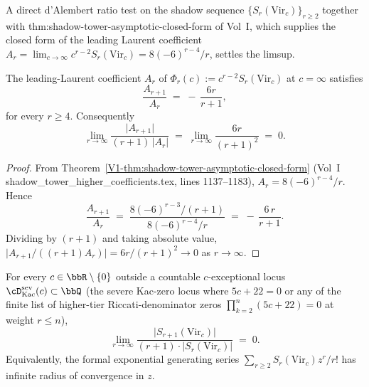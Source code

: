 A direct d'Alembert ratio test on the shadow sequence
$\{S_r(\mathrm{Vir}_c)\}_{r \ge 2}$ together with
\textsf{thm:shadow-tower-asymptotic-closed-form} of Vol~I, which supplies the
closed form of the leading Laurent coefficient
$A_r = \lim_{c \to \infty} c^{r-2} S_r(\mathrm{Vir}_c) =
8 (-6)^{r-4} / r$, settles the limsup.

\begin{lemma}
\label{lem:leading-coefficient-ratio-identity}
The leading-Laurent coefficient $A_r$ of
$\Phi_r(c) := c^{r-2} S_r(\mathrm{Vir}_c)$ at $c = \infty$ satisfies
\[
 \frac{A_{r+1}}{A_r}
 \;=\;
 -\,\frac{6 r}{r+1},
\]
for every $r \ge 4$. Consequently
\[
 \lim_{r \to \infty}
 \frac{\lvert A_{r+1} \rvert}{(r+1)\,\lvert A_r \rvert}
 \;=\;
 \lim_{r \to \infty}
 \frac{6 r}{(r+1)^2}
 \;=\;
 0.
\]
\end{lemma}

\begin{proof}
From Theorem~\ref{V1-thm:shadow-tower-asymptotic-closed-form}
(Vol~I shadow\_tower\_higher\_coefficients.tex, lines 1137--1183),
$A_r = 8 (-6)^{r-4} / r$. Hence
\[
 \frac{A_{r+1}}{A_r}
 \;=\;
 \frac{8 (-6)^{r-3} / (r+1)}{8 (-6)^{r-4} / r}
 \;=\;
 -\,\frac{6\,r}{r+1}.
\]
Dividing by $(r+1)$ and taking absolute value,
$\lvert A_{r+1} / ((r+1) A_r) \rvert = 6r / (r+1)^2 \to 0$ as
$r \to \infty$.
\end{proof}

\begin{proposition}
\label{prop:virasoro-ratio-test}
For every $c \in \bbR \setminus \{0\}$ outside a countable
$c$-exceptional locus $\cD^{\mathrm{sev}}_{\mathrm{Kac}}(c) \subset \bbQ$
(the severe Kac-zero locus where $5 c + 22 = 0$ or any of the finite
list of higher-tier Riccati-denominator zeros $\prod_{k=2}^{n}(5c+22) =
0$ at weight $r \le n$),
\[
 \lim_{r \to \infty}
 \frac{\lvert S_{r+1}(\mathrm{Vir}_c) \rvert}
 {(r+1) \cdot \lvert S_r(\mathrm{Vir}_c) \rvert}
 \;=\;
 0.
\]
Equivalently, the formal exponential generating series
$\sum_{r \ge 2} S_r(\mathrm{Vir}_c) z^r / r!$ has infinite radius of
convergence in $z$.
\end{proposition}


